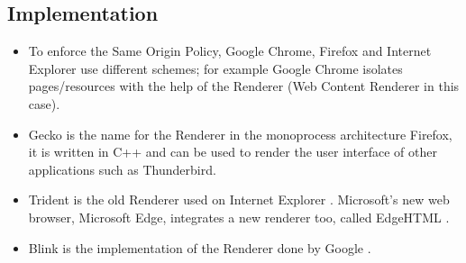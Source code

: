 \documentclass{sig-alternate-05-2015}
\begin{document}
  \subsection*{Implementation}
  \begin{itemize}
    \item To enforce the Same Origin Policy, Google Chrome, Firefox and Internet Explorer use different schemes; for example Google Chrome isolates pages/resources with the help of the Renderer (Web Content Renderer in this case).
    \item Gecko \cite{gecko2} is the name for the Renderer in the monoprocess architecture Firefox, it is written in C++ and can be used to render the user interface of other applications such as Thunderbird.
    \item Trident is the old Renderer used on Internet Explorer \cite{Crowley2010}. Microsoft's new web browser, Microsoft Edge, integrates a new renderer too, called EdgeHTML \cite{edgehtml}.
    \item Blink is the implementation of the Renderer done by Google \cite{blink}.

  \end{itemize}
\end{document}
